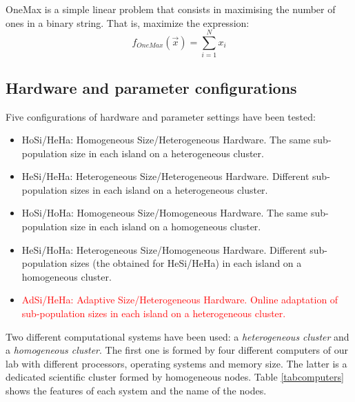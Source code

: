 \documentclass[final,1p,times]{elsarticle}
\begin{document}
OneMax is a simple linear problem that consists in maximising the number of ones in a binary string. That is, maximize the expression:
\begin{equation}
f_{OneMax}(\vec{x}) = \sum_{i=1}^{N}{x_{i}}
\end{equation}

\subsection{Hardware and parameter configurations}

Five configurations of hardware and parameter settings have been tested:

\begin{itemize}
\item HoSi/HeHa: Homogeneous Size/Heterogeneous Hardware. The same sub-population size in each island on a heterogeneous cluster.
\item HeSi/HeHa: Heterogeneous Size/Heterogeneous Hardware. Different sub-population sizes in each island on a heterogeneous cluster.
\item HoSi/HoHa: Homogeneous Size/Homogeneous Hardware. The same sub-population size in each island on a homogeneous cluster.
\item HeSi/HoHa: Heterogeneous Size/Homogeneous Hardware. Different sub-population sizes (the obtained for HeSi/HeHa) in each island on a homogeneous cluster.

\item \textcolor{red}{AdSi/HeHa: Adaptive Size/Heterogeneous Hardware. Online adaptation of sub-population sizes in each island on a heterogeneous cluster.}
\end{itemize}

Two different computational systems have been used: a {\em heterogeneous cluster} and a {\em homogeneous cluster}. The first one is formed by four different computers of our lab with different processors, operating systems and memory size. The latter is a dedicated scientific cluster formed by homogeneous nodes. Table \ref{tabcomputers} shows the features of each system and the name of the nodes.
\end{document}
